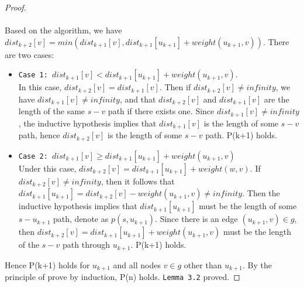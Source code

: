 \documentclass[11pt, oneside]{article}   	%
\newcommand\tab[1][1cm]{\hspace*{#1}}
\theoremstyle{definition}
\begin{document}
\begin{proof}
\\\\
Based on the algorithm, we have $dist_{k+2}[v] = min(dist_{k+1}[v], dist_{k+1}[u_{k+1}] + weight(u_{k+1}, v))$. There are two cases:
\begin{itemize}
  \item \texttt{Case 1: $dist_{k+1}[v] < dist_{k+1}[u_{k+1}] + weight(u_{k+1}, v)$}. \\
  In this case, $dist_{k+2}[v] = dist_{k+1}[v]$. Then if $dist_{k+2}[v] \neq infinity$, we have $dist_{k+1}[v] \neq infinity$, and that $dist_{k+2}[v]$ and $dist_{k+1}[v]$ are the length of the same $s-v$ path if there exists one. Since $dist_{k+1}[v] \neq infinity$, the inductive hypothesis implies that $dist_{k+1}[v]$ is the length of some $s-v$ path, hence $dist_{k+2}[v]$ is the length of some $s-v$ path. P(k+1) holds. 

  \item \texttt{Case 2: $dist_{k+1}[v] \geq dist_{k+1}[u_{k+1}] + weight(u_{k+1}, v)$}\\
  Under this case, $dist_{k+2}[v] = dist_{k+1}[u_{k+1}] + weight(w, v)$. If $dist_{k+2}[v] \neq infinity$, then it follows that $dist_{k+1}[u_{k+1}] = dist_{k+2}[v] - weight(u_{k+1}, v) \neq infinity$. Then the inductive hypothesis implies that $dist_{k+1}[u_{k+1}]$ must be the length of some $s-u_{k+1}$ path, denote as $p(s, u_{k+1})$. Since there is an edge $(u_{k+1}, v) \in g$, then $dist_{k+2}[v] = dist_{k+1}[u_{k+1}] + weight(u_{k+1}, v)$ must be the length of the $s-v$ path through $u_{k+1}$. P(k+1) holds. 
\end{itemize}
Hence P(k+1) holds for $u_{k+1}$ and all nodes $v \in g$ other than $u_{k+1}$. By the principle of prove by induction, P(n) holds. \texttt{\texttt{Lemma 3.2}} proved. 
\end{proof}
\tab\\ 
\end{document}
